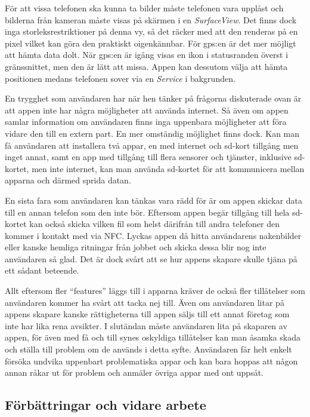\documentclass[11px, a4paper]{article}
\begin{document}
	För att vissa telefonen ska kunna ta bilder måste telefonen vara upplåst och bilderna från kameran måste visas på skärmen i en \emph{SurfaceView}. Det finns dock inga storleksrestriktioner på denna vy, så det räcker med att den renderas på en pixel vilket kan göra den praktiskt oigenkännbar. För gps:en är det mer möjligt att hämta data dolt. När gps:en är igång visas en ikon i statusranden överst i gränssnittet, men den är lätt att missa. Appen kan dessutom välja att hämta positionen medans telefonen sover via en \emph{Service} i bakgrunden.

	En trygghet som användaren har när hen tänker på frågorna diskuterade ovan är att appen inte har några möjligheter att använda internet. Så även om appen samlar information om användaren finns inga uppenbara möjligheter att föra vidare den till en extern part. En mer omständig möjlighet finns dock. Kan man få användaren att installera två appar, en med internet och sd-kort tillgång men inget annat, samt en app med tillgång till flera sensorer och tjänster, inklusive sd-kortet, men inte internet, kan man använda sd-kortet för att kommunicera mellan apparna och därmed sprida datan.

	En sista fara som användaren kan tänkas vara rädd för är om appen skickar data till en annan telefon som den inte bör. Eftersom appen begär tillgång till hela sd-kortet kan också skicka vilken fil som helst därifrån till andra telefoner den kommer i kontakt med via NFC. Lyckas appen då hitta användarens nakenbilder eller kanske hemliga ritningar från jobbet och skicka dessa blir nog inte användaren så glad. Det är dock svårt att se hur appens skapare skulle tjäna på ett sådant beteende.

	Allt eftersom fler ``features'' läggs till i apparna kräver de också fler tillåtelser som användaren kommer ha svårt att tacka nej till. Även om användaren litar på appens skapare kanske rättigheterna till appen säljs till ett annat företag som inte har lika rena avsikter. I slutändan måste användaren lita på skaparen av appen, för även med få och till synes oskyldiga tillåtelser kan man åsamka skada och ställa till problem om de används i detta syfte. Användaren får helt enkelt försöka undvika uppenbart problematiska appar och kan bara hoppas att någon annan råkar ut för problem och anmäler övriga appar med ont uppsåt.


\subsection{Förbättringar och vidare arbete}
\end{document}
